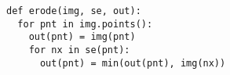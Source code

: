 \documentclass[varwidth=5.5cm, border={0.1cm 0.1cm 0.1cm 0.1cm}]{standalone}
\begin{document}
\begin{verbatim}
def erode(img, se, out):
  for pnt in img.points():
    out(pnt) = img(pnt)
    for nx in se(pnt):
      out(pnt) = min(out(pnt), img(nx))
\end{verbatim}
\end{document}
